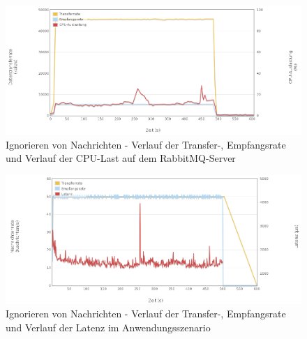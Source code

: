 \documentclass[	a4paper,
			11pt,
			oneside,
			parskip]{scrartcl}
\begin{document}
		\begin{figure}[!htb]
			\centering
			\includegraphics[width=\textwidth]{img/no/no_server2.png}
			\caption{Ignorieren von Nachrichten - Verlauf der Transfer-, Empfangsrate und Verlauf der CPU-Last auf dem RabbitMQ-Server}
			\label{fig:no-server2}
		\end{figure}
		
		\begin{figure}[!htb]
			\centering
			\includegraphics[width=\textwidth]{img/no/no_scenario.png}
			\caption{Ignorieren von Nachrichten - Verlauf der Transfer-, Empfangsrate und Verlauf der Latenz im Anwendungsszenario}
			\label{fig:no-scenario}
		\end{figure}
	
\end{document}
